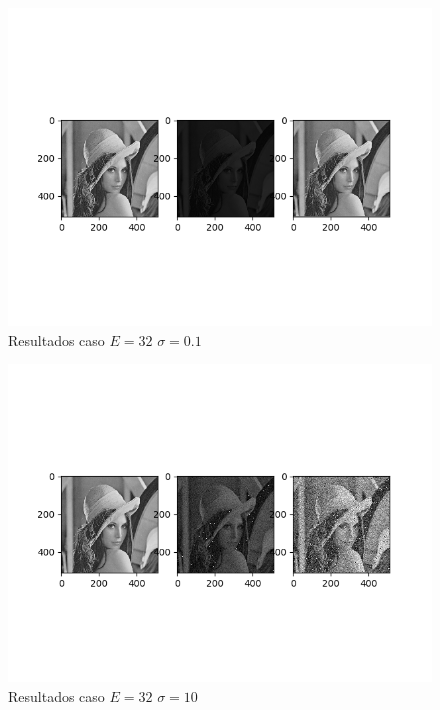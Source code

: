 \begin{figure}[ht]
\includegraphics[scale=0.9]{Imagenes/E32S01}
\centering
\caption{Resultados caso $E=32$ $\sigma = 0.1$ }
\end{figure}
 
\begin{figure}[h!]
\includegraphics[scale=0.9]{Imagenes/E32S10}
\centering
\caption{Resultados caso $E=32$ $\sigma = 10$ }
\end{figure}

